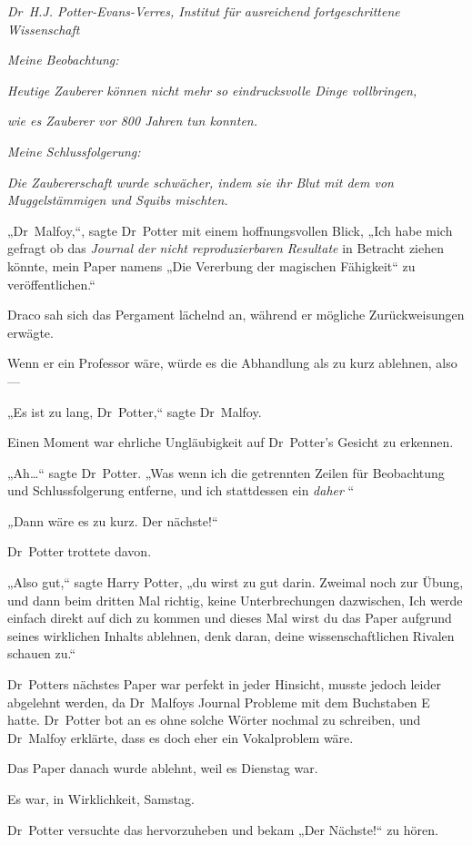 {\emph{Dr~H.J. Potter-Evans-Verres, Institut für ausreichend fortgeschrittene Wissenschaft}

\emph{Meine Beobachtung:}

\emph{Heutige Zauberer können nicht mehr so eindrucksvolle Dinge vollbringen,}

\emph{wie es Zauberer vor 800 Jahren tun konnten.}

\emph{Meine Schlussfolgerung:}

\emph{Die Zaubererschaft wurde schwächer, indem sie ihr Blut mit dem von Muggelstämmigen und Squibs mischten.}

„Dr~Malfoy,“, sagte Dr~Potter mit einem hoffnungsvollen Blick, „Ich habe mich gefragt ob das \emph{Journal der nicht reproduzierbaren Resultate} in Betracht ziehen könnte, mein Paper namens „Die Vererbung der magischen Fähigkeit“ zu veröffentlichen.“

Draco sah sich das Pergament lächelnd an, während er mögliche Zurückweisungen erwägte.

Wenn er ein Professor wäre, würde es die Abhandlung als zu kurz ablehnen, also—

„Es ist zu lang, Dr~Potter,“ sagte Dr~Malfoy.

Einen Moment war ehrliche Ungläubigkeit auf Dr~Potter's Gesicht zu erkennen.

„Ah…“ sagte Dr~Potter. „Was wenn ich die getrennten Zeilen für Beobachtung und Schlussfolgerung entferne, und ich stattdessen ein \emph{daher \later}“

\emph{„}Dann wäre es zu kurz. Der nächste!“

Dr~Potter trottete davon.

„Also gut,“ sagte Harry Potter, „du wirst zu gut darin. Zweimal noch zur Übung, und dann beim dritten Mal richtig, keine Unterbrechungen dazwischen, Ich werde einfach direkt auf dich zu kommen und dieses Mal wirst du das Paper aufgrund seines wirklichen Inhalts ablehnen, denk daran, deine wissenschaftlichen Rivalen schauen zu.“

Dr~Potters nächstes Paper war perfekt in jeder Hinsicht, musste jedoch leider abgelehnt werden, da Dr~Malfoys Journal Probleme mit dem Buchstaben E hatte. Dr~Potter bot an es ohne solche Wörter nochmal zu schreiben, und Dr~Malfoy erklärte, dass es doch eher ein Vokalproblem wäre.

Das Paper danach wurde ablehnt, weil es Dienstag war.

Es war, in Wirklichkeit, Samstag.

Dr~Potter versuchte das hervorzuheben und bekam „Der Nächste!“ zu hören.

}
